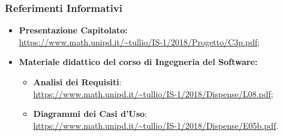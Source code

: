 \subsubsection{Referimenti Informativi}
\begin{itemize}
\item \textbf{Presentazione Capitolato:}\\ \url{https://www.math.unipd.it/~tullio/IS-1/2018/Progetto/C3p.pdf};
\item \textbf{Materiale didattico del corso di Ingegneria del Software:}
	\begin{itemize}
	\item \textbf{Analisi dei Requisiti}:\\ \url{https://www.math.unipd.it/~tullio/IS-1/2018/Dispense/L08.pdf};
	\item \textbf{Diagrammi dei Casi d'Uso}:\\ \url{https://www.math.unipd.it/~tullio/IS-1/2018/Dispense/E05b.pdf}.
	\end{itemize}
\end{itemize}
